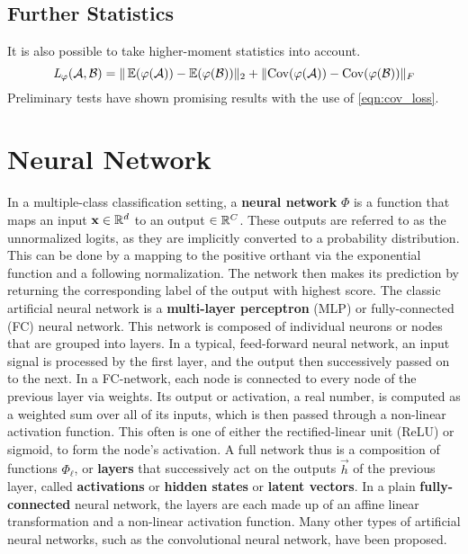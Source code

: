 \subsection{Further Statistics}

It is also possible to take higher-moment statistics into account. 
%
\begin{equation*}
    \textit{L} _{\varphi} (\mathcal A, \mathcal B) = 
    \|\operatorname{\mathbb{E}} ({\varphi (\mathcal A)}) - \operatorname{\mathbb{E}} ({\varphi (\mathcal B)})\|_2 +
    \|\text{Cov} ({\varphi (\mathcal A)}) - \text{Cov} ({\varphi (\mathcal B)})\|_F
    \label{eqn:cov_loss}
\end{equation*}
%
Preliminary tests have shown promising results with the use of \cref{eqn:cov_loss}.



\section{Neural Network}
\label{sec:nn_def}

In a multiple-class classification setting, a \textbf{neural network} $\Phi$ is a function that maps an input $\mathbf x \in \mathbb{R}^d$ to an output $\in \mathbb{R}^C$.
These outputs are referred to as the unnormalized logits, as they are 
implicitly converted to a probability distribution.
This can be done by a mapping to the positive orthant via the exponential function and
a following normalization.
The network then makes its prediction by returning the corresponding label
of the output with highest score.
The classic artificial neural network is a \textbf{multi-layer perceptron} (MLP) or fully-connected (FC) neural network.
This network is composed of individual neurons or nodes 
that are grouped into layers.
In a typical, feed-forward neural network, an input signal is processed by the first
layer, and the output then successively passed on to the next.
In a FC-network, each node is connected to every node of the previous layer via weights.
Its output or activation, a real number, is computed as a weighted sum over all of 
its inputs, which is then passed through a non-linear activation function.
This often is one of either the rectified-linear unit (ReLU) or sigmoid, to form the node's activation. 
A full network thus is a composition of functions $\Phi_\ell$, or \textbf{layers} that 
successively act on the outputs $\vec h$ of the previous layer, called \textbf{activations} or \textbf{hidden states} or \textbf{latent vectors}. 
In a plain \textbf{fully-connected} neural network, the layers are each made up of an affine linear transformation and a non-linear activation function.
Many other types of artificial neural networks, such as the convolutional neural network, 
have been proposed.

